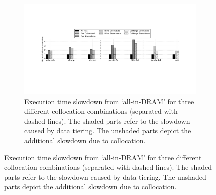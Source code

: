 \begin{figure}
  \centering
\begin{subfigure}{\linewidth}
  \includegraphics[width=\linewidth]{figures/tiering2.pdf}

      \captionsetup{labelformat=empty}

\caption{Execution time slowdown from `all-in-DRAM' for three different collocation combinations (separated with dashed lines). The shaded parts refer to the slowdown caused by data tiering. The unshaded parts depict the additional slowdown due to collocation.}
  \end{subfigure}


\end{figure}
